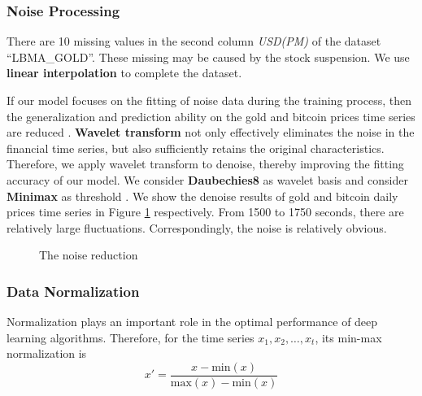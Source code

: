 \documentclass[12pt]{article}
\begin{document}
\subsubsection{Noise Processing}
There are 10 missing values in the second column \emph{USD(PM)} of the dataset “LBMA\_GOLD”. These missing may be caused by the stock suspension. We use \textbf{linear interpolation} to complete the dataset.

If our model focuses on the fitting of noise data during the training process, then the generalization and prediction ability on the gold and bitcoin prices time series are reduced \cite{7}. \textbf{Wavelet transform} not only effectively eliminates the noise in the financial time series, but also sufficiently retains the original characteristics. Therefore, we apply wavelet transform to denoise, thereby improving the fitting accuracy of our model. We consider  \textbf{Daubechies8} as wavelet basis and consider \textbf{Minimax} as threshold \cite{8}. We show the denoise results of gold and bitcoin daily prices time series in Figure \ref{F1} respectively. From 1500 to 1750 seconds, there are relatively large fluctuations. Correspondingly, the noise is relatively obvious.
\begin{figure}[hbt]
 \centering
 \quad
 \caption{The noise reduction}
 \label{F1} %
\end{figure}

\subsubsection{Data Normalization}
Normalization plays an important role in the optimal performance of deep learning algorithms. Therefore, for the time series $x_1, x_2, \dots, x_t$, its min-max normalization is
\begin{equation*}
x'=\frac{x-\text{min}(x)}{\text{max}(x)-\text{min}(x)}
\end{equation*}
\end{document}

